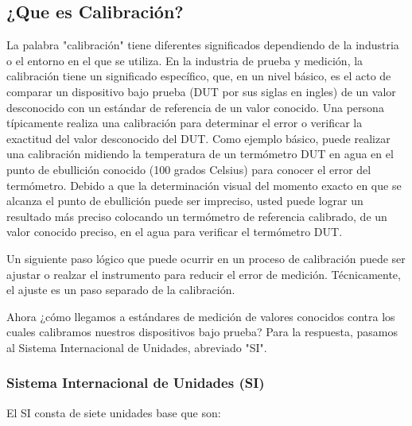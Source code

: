 \subsection{¿Que es Calibración?}

\par 
La palabra "calibración" tiene diferentes significados dependiendo de la industria o el entorno en el que se utiliza. En la industria de prueba y medición, la calibración tiene un significado específico, que, en un nivel básico, es el acto de comparar un dispositivo bajo prueba (DUT por sus siglas en ingles) de un valor desconocido con un estándar de referencia de un valor conocido. Una persona típicamente realiza una calibración para determinar el error o verificar la exactitud del valor desconocido del DUT. Como ejemplo básico, puede realizar una calibración midiendo la temperatura de un termómetro DUT en agua en el punto de ebullición conocido (100 grados Celsius) para conocer el error del termómetro. Debido a que la determinación visual del momento exacto en que se alcanza el punto de ebullición puede ser impreciso, usted puede lograr un resultado más preciso colocando un termómetro de referencia calibrado, de un valor conocido preciso, en el agua para verificar el termómetro DUT\cite{calibracion-fluke1}.

\par \noindent
Un siguiente paso lógico que puede ocurrir en un proceso de calibración puede ser ajustar o realzar el instrumento para reducir el error de medición. Técnicamente, el ajuste es un paso separado de la calibración\cite{calibracion-fluke}.

\par \noindent
Ahora ¿cómo llegamos a estándares de medición de valores conocidos contra los cuales calibramos nuestros dispositivos bajo prueba? Para la respuesta, pasamos al Sistema Internacional de Unidades, abreviado "SI". 

\subsubsection{Sistema Internacional de Unidades (SI) \cite{calibracion-fluke}}

\par \noindent
El SI consta de siete unidades base que son:

